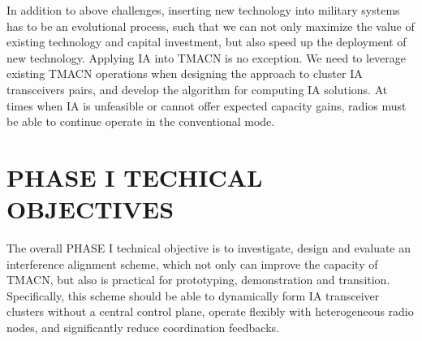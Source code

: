 \documentclass[letterpaper,11pt,onecolumn]{article}
\begin{document}
In addition to above challenges, inserting new technology into military systems has to be an evolutional process, such that we can not only maximize the value of existing technology and capital investment, but also speed up the deployment of new technology. Applying IA into TMACN is no exception. We need to leverage existing TMACN operations when designing the approach to cluster IA transceivers pairs, and develop the algorithm for computing IA solutions. At times when IA is unfeasible or cannot offer expected capacity gains, radios must be able to continue operate in the conventional mode.


\section{PHASE I TECHICAL OBJECTIVES}


The overall PHASE I technical objective is to investigate, design and evaluate an interference alignment scheme, which not only can improve the capacity of TMACN, but also is practical for prototyping, demonstration and transition. Specifically, this scheme should be able to dynamically form IA transceiver clusters without a central control plane,  operate flexibly with heterogeneous radio nodes, and significantly reduce coordination feedbacks. 
\end{document}
